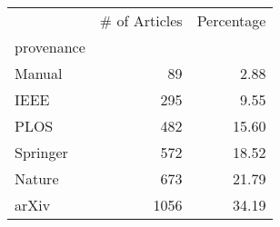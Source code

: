 \begin{tabular}{lrr}
\toprule
{} &  \# of Articles &  Percentage \\
provenance &                &             \\
\midrule
Manual     &             89 &        2.88 \\
IEEE       &            295 &        9.55 \\
PLOS       &            482 &       15.60 \\
Springer   &            572 &       18.52 \\
Nature     &            673 &       21.79 \\
arXiv      &           1056 &       34.19 \\
\bottomrule
\end{tabular}
